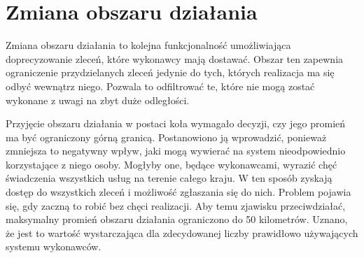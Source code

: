 \section{Zmiana obszaru działania}

Zmiana obszaru działania to kolejna funkcjonalność umożliwiająca doprecyzowanie zleceń, które wykonawcy mają dostawać. Obszar ten zapewnia ograniczenie przydzielanych zleceń jedynie do tych, których realizacja ma się odbyć wewnątrz niego. Pozwala to odfiltrować te, które nie mogą zostać wykonane z uwagi na zbyt duże odległości. 

\pagebreak


Przyjęcie obszaru działania w postaci koła wymagało decyzji, czy jego promień ma być ograniczony górną granicą. Postanowiono ją wprowadzić, ponieważ zmniejsza to negatywny wpływ, jaki mogą wywierać na system nieodpowiednio korzystające z niego osoby. Mogłyby one, będące wykonawcami, wyrazić chęć świadczenia wszystkich usług na terenie całego kraju. W ten sposób zyskają dostęp do wszystkich zleceń i możliwość zgłaszania się do nich. Problem pojawia się, gdy zaczną to robić bez chęci realizacji. Aby temu zjawisku przeciwdziałać, maksymalny promień obszaru działania ograniczono do 50 kilometrów. Uznano, że jest to wartość wystarczająca dla zdecydowanej liczby prawidłowo używających systemu wykonawców.



